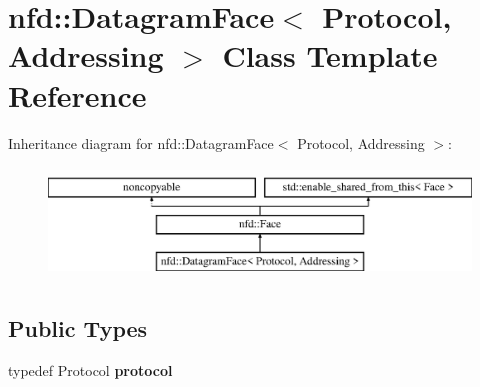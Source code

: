 \hypertarget{classnfd_1_1DatagramFace}{}\section{nfd\+:\+:Datagram\+Face$<$ Protocol, Addressing $>$ Class Template Reference}
\label{classnfd_1_1DatagramFace}
Inheritance diagram for nfd\+:\+:Datagram\+Face$<$ Protocol, Addressing $>$\+:\begin{figure}[H]
\begin{center}
\leavevmode
\includegraphics[height=3.000000cm]{classnfd_1_1DatagramFace}
\end{center}
\end{figure}
\subsection*{Public Types}
\begin{DoxyCompactItemize}
\item 
typedef Protocol {\bfseries protocol}\hypertarget{classnfd_1_1DatagramFace_a5f992ba57a944f334a8fea2e891dd7fa}{}\label{classnfd_1_1DatagramFace_a5f992ba57a944f334a8fea2e891dd7fa}

\end{DoxyCompactItemize}
